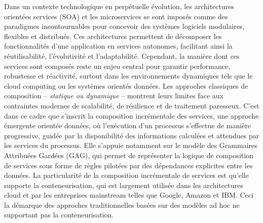 \let\oldprintchaptertitle=\printchaptertitle
\renewcommand{\printchaptertitle}[1]{%
	\vspace*{-75pt}
	\oldprintchaptertitle{#1}
}%
\let\printchaptertitle=\oldprintchaptertitle
Dans un contexte technologique en perpétuelle évolution, les architectures orientées services (SOA) et les microservices se sont imposés comme des paradigmes incontournables pour concevoir des systèmes logiciels modulaires, flexibles et distribués. 
Ces architectures permettent de décomposer les fonctionnalités d'une application en services autonomes, facilitant ainsi la réutilisabilité, l'évolutivité et l’adaptabilité. Cependant, la manière dont ces services sont composés reste un enjeu central pour garantir performance, robustesse et réactivité, surtout dans les environnements dynamiques tels que le cloud computing ou les systèmes orientés données.
Les approches classiques de composition – \textit{statique ou dynamique} – montrent leurs limites face aux contraintes modernes de scalabilité, de résilience et de traitement paresseux. 
C’est dans ce cadre que s’inscrit la composition incrémentale des services, une approche émergente orientée données, où l’exécution d’un processus s’effectue de manière progressive, guidée par la disponibilité des informations calculées et attendues par les services du processus. Elle s’appuie notamment sur le modèle des Grammaires Attribuées Gardées (GAG), qui permet de représenter la logique de composition de services sous forme de règles pilotées par des dépendances explicites entre les données. La particularité de la composition incrémentale de services est qu’elle supporte la conteneurisation, qui est largement utilisée dans les architectures cloud et par les entreprises mainstream telles que Google, Amazon et IBM. Ceci la démarque des approches traditionnelles basées sur des modèles ad hoc ne supportant pas la conteneurisation.
